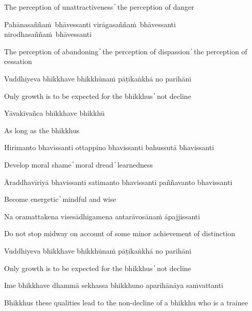 \begin{cprenglish}
The perception of unattractiveness  ̓  the perception of danger
\end{cprenglish}

Pahānasaññaṁ bhāvessanti virāgasaññaṁ bhāvessanti nirodhasaññaṁ bhāvessanti

\begin{cprenglish}
The perception of abandoning  ̓  the perception of dispassion  ̓
the perception of cessation
\end{cprenglish}

Vuddhiyeva bhikkhave bhikkhūnaṁ pāṭikaṅkhā no parihāni

\begin{cprenglish}
Only growth is to be expected for the bhikkhus  ̓  not decline
\end{cprenglish}

Yāvakīvañca bhikkhave bhikkhū

\begin{cprenglish}
As long as the bhikkhus
\end{cprenglish}

Hirimanto bhavissanti ottappino bhavissanti bahussutā bhavissanti

\begin{cprenglish}
Develop moral shame  ̓  moral dread  ̓  learnedness
\end{cprenglish}

Āraddhavīriyā bhavissanti satimanto bhavissanti paññavanto bhavissanti

\begin{cprenglish}
Become energetic  ̓  mindful and wise
\end{cprenglish}

Na oramattakena visesādhigamena antarāvosānaṁ āpajjissanti

\begin{cprenglish}
Do not stop midway on account of some minor achievement of distinction
\end{cprenglish}

Vuddhiyeva bhikkhave bhikkhūnaṁ pāṭikaṅkhā no parihāni

\begin{cprenglish}
Only growth is to be expected for the bhikkhus  ̓  not decline
\end{cprenglish}


Ime bhikkhave dhammā sekhassa bhikkhuno aparihānāya saṁvattanti

\begin{cprenglish}
Bhikkhus these qualities lead to the non-decline of a bhikkhu who is a trainee
\end{cprenglish}

